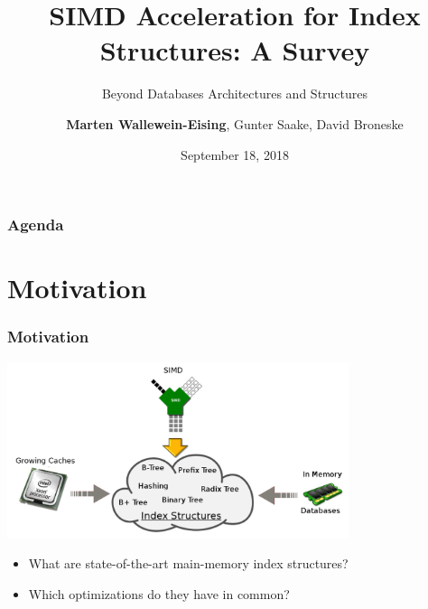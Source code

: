 \documentclass{beamer}
\title[SIMD Acceleration for main-memory Index Structures: A Survey]{SIMD Acceleration for  Index Structures: A Survey}
\subtitle{Beyond Databases Architectures and Structures}
\author[Wallewein-Eising et al.]{\textbf{Marten Wallewein-Eising}, Gunter Saake, David Broneske}
\date{September 18, 2018}
\institute{University of Magdeburg, Germany}
\begin{document}
\begin{frame}[plain]
\titlepage


\end{frame}

\section[Agenda]{}
\begin{frame}
\frametitle{Agenda}
\tableofcontents
\end{frame}

\section{Motivation}
\begin{frame}
\frametitle{Motivation}
\begin{center}
\includegraphics[width=0.75\textwidth]{img/big_picture_new.pdf}
\end{center}
\begin{itemize}[label=\textbullet,leftmargin=1em]
\item What are state-of-the-art main-memory index structures?
\item Which optimizations do they have in common?
\end{itemize}
\end{frame}
\end{document}
